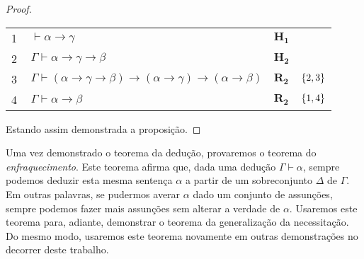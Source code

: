 \begin{tcolorbox}[enhanced jigsaw, breakable, sharp corners, colframe=black, colback=white, boxrule=0.5pt, left=1.5mm, right=1.5mm, top=1.5mm, bottom=1.5mm]
\begin{theorem}[Dedução]
\begin{proof}
\begin{case}
        \vspace{0.5\baselineskip}
        \footnotesize
        \setlength{\rowskip}{0.5\baselineskip}
        \begin{xltabular}{\textwidth}{r | X l l}
            \scriptsize{\phantom{0}1}\phantom{ } & $\ \vdash\alpha\to\gamma$                                                        & $\mathbf{H_1}$\phantom{1}                & \\[\rowskip]
            \scriptsize{\phantom{0}2}\phantom{ } & $\ \Gamma\vdash\alpha\to\gamma\to\beta$                                          & $\mathbf{H_2}$                           & \\[\rowskip]
            \scriptsize{\phantom{0}3}\phantom{ } & $\ \Gamma\vdash(\alpha\to\gamma\to\beta)\to(\alpha\to\gamma)\to(\alpha\to\beta)$ & $\hyperref[modal.rule.2]{\mathbf{R_2}}$  & $\left\{2,3\right\}$\\[\rowskip]
            \scriptsize{\phantom{0}4}\phantom{ } & $\ \Gamma\vdash\alpha\to\beta$                                                   & $\hyperref[modal.rule.2]{\mathbf{R_2}}$  & $\left\{1,4\right\}$
        \end{xltabular}
        \normalsize
        \end{case}

        \vspace{0.5\baselineskip}
        Estando assim demonstrada a proposição.
        \end{proof}
    \end{theorem}
    \end{tcolorbox}
    \vspace{.5\baselineskip}
    Uma vez demonstrado o teorema da dedução, provaremos o teorema do \emph{enfraquecimento}.
    Este teorema afirma que, dada uma dedução $\Gamma\vdash\alpha$, sempre podemos deduzir esta mesma sentença $\alpha$ a partir de um sobreconjunto $\Delta$ de $\Gamma$.
    Em outras palavras, se pudermos averar $\alpha$ dado um conjunto de assunções, sempre podemos fazer mais assunções sem alterar a verdade de $\alpha$.
    Usaremos este teorema para, adiante, demonstrar o teorema da generalização da necessitação.
    Do mesmo modo, usaremos este teorema novamente em outras demonstrações no decorrer deste trabalho.
    \vspace{.5\baselineskip}
